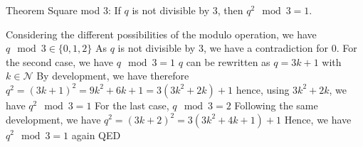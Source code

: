 Theorem Square mod 3:
If $q$ is not divisible by $3$, then $q^2 \mod 3 = 1$.


Considering the different possibilities of the modulo operation, we have $q \mod 3 \in \{ 0, 1, 2 \}$
As $q$ is not divisible by $3$, we have a contradiction for $0$.
For the second case, we have $q \mod 3 = 1$
    $q$ can be rewritten as $q = 3k + 1$ with $k \in \mathcal{N}$
    By development, we have therefore $q^2 = (3k+1)^2 = 9k^2+6k+1 = 3(3k^2 + 2k) + 1$
    hence, using $3k^2 + 2k$, we have $q^2 \mod 3 = 1$
For the last case, $q \mod 3 = 2$
    Following the same development, we have $q^2 = (3k+2)^2 = 3(3k^2+4k+1) +1$
    Hence, we have $q^2 \mod 3 = 1$ again
QED